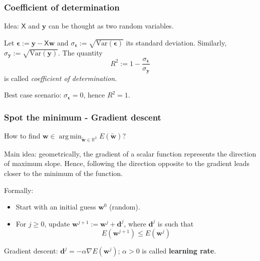 \documentclass{beamer}
\DeclareMathOperator*{\argmin}{arg\,min}
\begin{document}
	\begin{frame}
		\frametitle{Coefficient of determination}
		Idea: $\mathsf{X}$ and $\bm{y}$ can be thought as two random variables.
		
		\vspace{5mm}
		
		Let $\bm{\epsilon} := \bm{y} - \mathsf{X}\bm{w}$ and $\sigma_{\bm{\epsilon}}:= \sqrt{\text{Var}(\bm{\epsilon})}$ its standard deviation. Similarly, $\sigma_{\bm{y}}:= \sqrt{\text{Var}(\bm{y})}$.  The quantity
		\begin{equation*}
			R^2 := 1 - \frac{\sigma_{\bm{\epsilon}}}{\sigma_{\bm{y}}}
		\end{equation*}
		is called \textsl{coefficient of determination}.
		
		\vspace{5mm}
		
		Best case scenario: $\sigma_{\bm{\epsilon}} = 0$, hence $R^2 = 1$.
		
	\end{frame}

	\begin{frame}
		\frametitle{Spot the minimum - Gradient descent}
		How to find $\bm{w} \in \argmin_{\tilde{\bm{w}} \in \mathbb{R}^2} E(\tilde{\bm{w}})$?
		
		\vspace{5mm}
		
		Main idea: geometrically, the gradient of a scalar function represents the direction of maximum slope. Hence, following the direction opposite to the gradient leads closer to the minimum of the function.
		
		\vspace{5mm}
		
		Formally:
		\begin{itemize}
			\item Start with an initial guess $\bm{w}^0$ (random).
			\item For $j \geq 0$, update $\bm{w}^{j+1} := \bm{w}^{j} + \bm{d}^j$, where $\bm{d}^j$ is such that
			\begin{equation*}
				E(\bm{w}^{j+1}) \leq E(\bm{w}^j) 
			\end{equation*}
		\end{itemize}
		Gradient descent: $\bm{d}^j = - \alpha \nabla E(\bm{w}^j)$; $\alpha>0$ is called \textbf{learning rate}.
	\end{frame}
\end{document}
